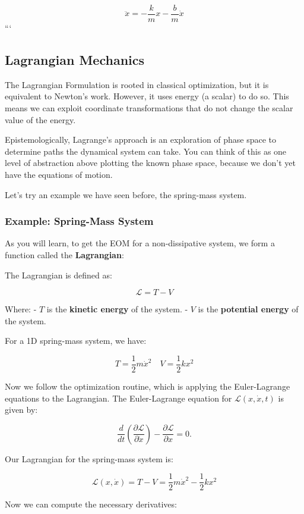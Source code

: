 \documentclass[11pt]{article}
\begin{document}
\[\ddot{x} = -\frac{k}{m} x - \frac{b}{m} \dot{x}\] ```

    \subsection{Lagrangian Mechanics}\label{lagrangian-mechanics}

The Lagrangian Formulation is rooted in classical optimization, but it
is equivalent to Newton's work. However, it uses energy (a scalar) to do
so. This means we can exploit coordinate transformations that do not
change the scalar value of the energy.

Epistemologically, Lagrange's approach is an exploration of phase space
to determine paths the dynamical system can take. You can think of this
as one level of abstraction above plotting the known phase space,
because we don't yet have the equations of motion.

Let's try an example we have seen before, the spring-mass system.

\subsubsection{Example: Spring-Mass
System}\label{example-spring-mass-system}

As you will learn, to get the EOM for a non-dissipative system, we form
a function called the \textbf{Lagrangian}:

The Lagrangian is defined as:

\[
\mathcal{L} = T - V
\]

Where: - \(T\) is the \textbf{kinetic energy} of the system. - \(V\) is
the \textbf{potential energy} of the system.

For a 1D spring-mass system, we have:

\[T = \frac{1}{2} m \dot{x}^2 \quad V = \frac{1}{2} k x^2\]

Now we follow the optimization routine, which is applying the
Euler-Lagrange equations to the Lagrangian. The Euler-Lagrange equation
for \(\mathcal{L}(x,\dot{x},t)\) is given by:

\[
\frac{d}{dt} \left( \frac{\partial \mathcal{L}}{\partial \dot{x}} \right) - \frac{\partial \mathcal{L}}{\partial x} = 0.
\]

Our Lagrangian for the spring-mass system is:

\[\mathcal{L}(x, \dot{x}) = T - V = \frac{1}{2} m \dot{x}^2 - \frac{1}{2} k x^2\]

Now we can compute the necessary derivatives:
\end{document}
